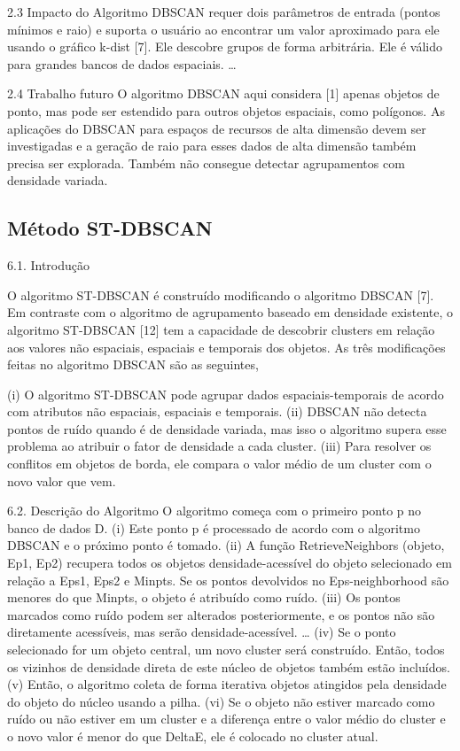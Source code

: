 2.3 Impacto do Algoritmo
DBSCAN requer dois parâmetros de entrada (pontos mínimos e raio) e suporta o usuário ao encontrar um valor aproximado para ele usando o gráfico k-dist [7]. Ele descobre grupos de forma arbitrária. Ele é válido para grandes bancos de dados espaciais.
…

2.4 Trabalho futuro
O algoritmo DBSCAN aqui considera [1] apenas objetos de ponto, mas pode ser estendido para outros objetos espaciais, como polígonos. As aplicações do DBSCAN para espaços de recursos de alta dimensão devem ser investigadas e a geração de raio para esses dados de alta dimensão também precisa ser explorada. Também não consegue detectar agrupamentos com densidade variada.


\subsection{Método ST-DBSCAN}

6.1. Introdução

O algoritmo ST-DBSCAN é construído modificando o algoritmo DBSCAN [7]. Em contraste com o algoritmo de agrupamento baseado em densidade existente, o algoritmo ST-DBSCAN [12] tem a capacidade de descobrir clusters em relação aos valores não espaciais, espaciais e temporais dos objetos. As três modificações feitas no algoritmo DBSCAN são as seguintes,

(i) O algoritmo ST-DBSCAN pode agrupar dados espaciais-temporais de acordo com atributos não espaciais, espaciais e temporais.
(ii) DBSCAN não detecta pontos de ruído quando é de densidade variada, mas isso o algoritmo supera esse problema ao atribuir o fator de densidade a cada cluster.
(iii) Para resolver os conflitos em objetos de borda, ele compara o valor médio de um cluster com o novo valor que vem.

6.2. Descrição do Algoritmo
O algoritmo começa com o primeiro ponto p no banco de dados D.
(i) Este ponto p é processado de acordo com o algoritmo DBSCAN e o próximo ponto é tomado.
(ii) A função RetrieveNeighbors (objeto, Ep1, Ep2) recupera todos os objetos densidade-acessível do objeto selecionado em relação a Eps1, Eps2 e Minpts. Se os pontos devolvidos no Eps-neighborhood são menores do que Minpts, o objeto é atribuído como ruído.
(iii) Os pontos marcados como ruído podem ser alterados posteriormente, e os pontos não são diretamente acessíveis, mas serão densidade-acessível.
…
(iv) Se o ponto selecionado for um objeto central, um novo cluster será construído. Então, todos os vizinhos de densidade direta de este núcleo de objetos também estão incluídos.
(v) Então, o algoritmo coleta de forma iterativa objetos atingidos pela densidade do objeto do núcleo usando a pilha.
(vi) Se o objeto não estiver marcado como ruído ou não estiver em um cluster e a diferença
entre o valor médio do cluster e o novo valor é menor do que DeltaE, ele é colocado no cluster atual.

